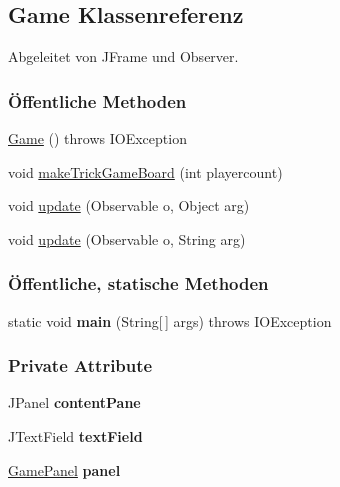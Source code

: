 \hypertarget{a00011}{\subsection{Game Klassenreferenz}
\label{a00011}
}


Abgeleitet von J\-Frame und Observer.

\subsubsection*{Öffentliche Methoden}
\begin{DoxyCompactItemize}
\item 
\hyperlink{a00011_a98d87ba6bde3f389e92664a2ef9bfcb1}{Game} ()  throws I\-O\-Exception 
\item 
void \hyperlink{a00011_af74d428669a1985071ce854ba7a2448c}{make\-Trick\-Game\-Board} (int playercount)
\item 
void \hyperlink{a00011_a2b67d42550fdf9ddd8f3878d0849965c}{update} (Observable o, Object arg)
\item 
void \hyperlink{a00011_a41caffb40957934b02960cf166c78494}{update} (Observable o, String arg)
\end{DoxyCompactItemize}
\subsubsection*{Öffentliche, statische Methoden}
\begin{DoxyCompactItemize}
\item 
\hypertarget{a00011_a8b260eecbaabcef8473fd87ada040682}{static void {\bfseries main} (String\mbox{[}$\,$\mbox{]} args)  throws I\-O\-Exception}\label{a00011_a8b260eecbaabcef8473fd87ada040682}

\end{DoxyCompactItemize}
\subsubsection*{Private Attribute}
\begin{DoxyCompactItemize}
\item 
\hypertarget{a00011_aee369a2eca6b8f16ea106cddf68273e8}{J\-Panel {\bfseries content\-Pane}}\label{a00011_aee369a2eca6b8f16ea106cddf68273e8}

\item 
\hypertarget{a00011_a361f69c3885676f88e8d42f906ff4e7a}{J\-Text\-Field {\bfseries text\-Field}}\label{a00011_a361f69c3885676f88e8d42f906ff4e7a}

\item 
\hypertarget{a00011_a163cdd80f2ed681bf118140cbf202892}{\hyperlink{a00013}{Game\-Panel} {\bfseries panel}}\label{a00011_a163cdd80f2ed681bf118140cbf202892}

\end{DoxyCompactItemize}
